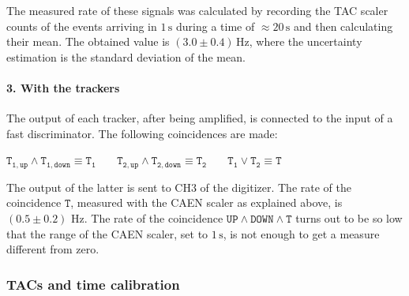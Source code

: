 \documentclass[a4paper]{article}
\begin{document}
The measured rate of these signals was calculated by recording the TAC scaler counts of the events arriving in $1\,\mathrm{s}$ during a time of $\approx20\,\mathrm{s}$ and then calculating their mean. The obtained value is $(3.0\pm0.4)\,\mathrm{Hz}$, where the uncertainty estimation is the standard deviation of the mean. 

\paragraph{3. With the trackers} 
The output of each tracker, after being amplified, is connected to the input of a fast discriminator. 
The following coincidences are made: 
\begin{center}
$\mathtt{T_{1,up}\wedge T_{1,down}\equiv T_1}$ $~~~~~~~\mathtt{T_{2,up}\wedge T_{2,down}\equiv T_2}~~~~~~~$ $\mathtt{T_1\vee T_2\equiv T}$ %
\end{center}
The output of the latter is sent to CH3 of the digitizer. The rate of the coincidence $\mathtt{T}$, measured with the CAEN scaler as explained above, is $(0.5\pm0.2)$ Hz. %
The rate of the coincidence $\mathtt{UP \wedge DOWN \wedge T}$ turns out to be so low that the range of the CAEN scaler, set to $1\,\mathrm{s}$, is not enough to get a measure different from zero.

\subsubsection{TACs and time calibration} \label{sect:time calibration}




\end{document}
